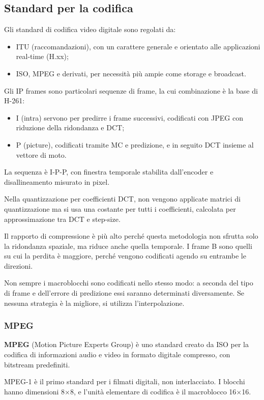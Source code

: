 \subsection{Standard per la codifica}
Gli standard di codifica video digitale sono regolati da:
\begin{itemize}
	\item ITU (raccomandazioni), con un carattere generale e orientato alle applicazioni real-time (H.xx);
	\item ISO, MPEG e derivati, per necessità più ampie come storage e broadcast.
\end{itemize}

Gli IP frames sono particolari sequenze di frame, la cui combinazione è la base di H-261:
\begin{itemize}
	\item I (intra) servono per predirre i frame successivi, codificati con JPEG con riduzione della ridondanza e DCT;
	\item P (picture), codificati tramite MC e predizione, e in seguito DCT insieme al vettore di moto.
\end{itemize}
La sequenza è I-P-P, con finestra temporale stabilita dall'encoder e disallineamento misurato in pixel.

Nella quantizzazione per coefficienti DCT, non vengono applicate matrici di quantizzazione ma si usa una costante per tutti i coefficienti, calcolata per approssimazione tra DCT e step-size.

Il rapporto di compressione è più alto perché questa metodologia non sfrutta solo la ridondanza spaziale, ma riduce anche quella temporale. I frame B sono quelli su cui la perdita è maggiore, perché vengono codificati agendo su entrambe le direzioni.

Non sempre i macroblocchi sono codificati nello stesso modo: a seconda del tipo di frame e dell'errore di predizione essi saranno determinati diversamente. Se nessuna strategia è la migliore, si utilizza l'interpolazione.

\subsubsection{MPEG}
\textbf{MPEG} (Motion Picture Experts Group) è uno standard creato da ISO per la codifica di informazioni audio e video in formato digitale compresso, con bitstream predefiniti. 

MPEG-1 è il primo standard per i filmati digitali, non interlacciato. I blocchi hanno dimensioni 8$\times$8, e l'unità elementare di codifica è il macroblocco 16$\times$16.

